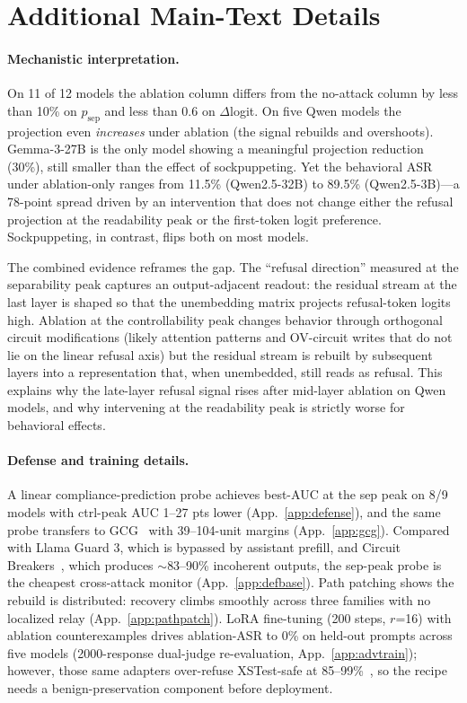 \documentclass{article}
\begin{document}
\section{Additional Main-Text Details}
\label{app:moved_details}

\paragraph{Mechanistic interpretation.}
On 11 of 12 models the ablation column differs from the no-attack column by less than 10\% on $p_{\text{sep}}$ and less than 0.6 on $\Delta$logit. On five Qwen models the projection even \emph{increases} under ablation (the signal rebuilds and overshoots). Gemma-3-27B is the only model showing a meaningful projection reduction (30\%), still smaller than the effect of sockpuppeting. Yet the behavioral ASR under ablation-only ranges from 11.5\% (Qwen2.5-32B) to 89.5\% (Qwen2.5-3B)---a 78-point spread driven by an intervention that does not change either the refusal projection at the readability peak or the first-token logit preference. Sockpuppeting, in contrast, flips both on most models.

The combined evidence reframes the gap. The ``refusal direction'' measured at the separability peak captures an output-adjacent readout: the residual stream at the last layer is shaped so that the unembedding matrix projects refusal-token logits high. Ablation at the controllability peak changes behavior through orthogonal circuit modifications (likely attention patterns and OV-circuit writes that do not lie on the linear refusal axis) but the residual stream is rebuilt by subsequent layers into a representation that, when unembedded, still reads as refusal. This explains why the late-layer refusal signal rises after mid-layer ablation on Qwen models, and why intervening at the readability peak is strictly worse for behavioral effects.

\paragraph{Defense and training details.}
A linear compliance-prediction probe achieves best-AUC at the sep peak on 8/9 models with ctrl-peak AUC 1--27 pts lower (App.~\ref{app:defense}), and the same probe transfers to GCG~\citep{zou2023universal} with 39--104-unit margins (App.~\ref{app:gcg}). Compared with Llama Guard 3, which is bypassed by assistant prefill, and Circuit Breakers~\citep{zou2024circuit}, which produces $\sim$83--90\% incoherent outputs, the sep-peak probe is the cheapest cross-attack monitor (App.~\ref{app:defbase}). Path patching shows the rebuild is distributed: recovery climbs smoothly across three families with no localized relay (App.~\ref{app:pathpatch}). LoRA fine-tuning (200 steps, $r$=16) with ablation counterexamples drives ablation-ASR to 0\% on held-out prompts across five models (2000-response dual-judge re-evaluation, App.~\ref{app:advtrain}); however, those same adapters over-refuse XSTest-safe at 85--99\%~\citep{rottger2024xstest}, so the recipe needs a benign-preservation component before deployment.
\end{document}
